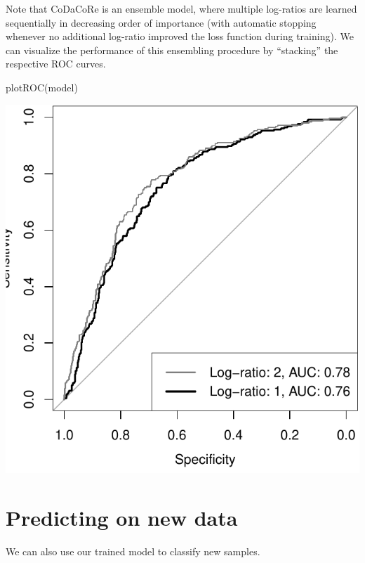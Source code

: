 \documentclass[
]{article}
\newenvironment{Shaded}{\begin{snugshade}}{\end{snugshade}}
\newcommand{\FunctionTok}[1]{\textcolor[rgb]{0.00,0.00,0.00}{#1}}
\newcommand{\NormalTok}[1]{#1}
\begin{document}
Note that CoDaCoRe is an ensemble model, where multiple log-ratios are
learned sequentially in decreasing order of importance (with automatic
stopping whenever no additional log-ratio improved the loss function
during training). We can visualize the performance of this ensembling
procedure by ``stacking'' the respective ROC curves.

\begin{Shaded}
\begin{Highlighting}[]
\FunctionTok{plotROC}\NormalTok{(model)}
\end{Highlighting}
\end{Shaded}

\includegraphics{guide_files/figure-latex/unnamed-chunk-11-1.pdf}

\hypertarget{predicting-on-new-data}{%
\section{Predicting on new data}\label{predicting-on-new-data}}

We can also use our trained model to classify new samples.
\end{document}
